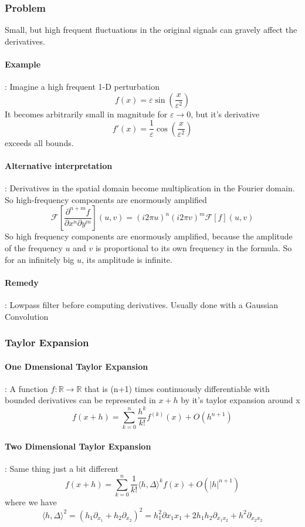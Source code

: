 \documentclass{article}
\begin{document}
\subsubsection{Problem}
Small, but high frequent fluctuations in the original signals can gravely affect the derivatives.

\paragraph{Example}: Imagine a high frequent 1-D perturbation
\[f(x) = \varepsilon\sin\left(\frac{x}{\varepsilon^2}\right)\]
It becomes arbitrarily small in magnitude for $\varepsilon \to 0$, but it's derivative
\[f'(x) = \frac{1}{\varepsilon}\cos\left(\frac{x}{\varepsilon^2}\right)\]
exceeds all bounds.

\paragraph{Alternative interpretation}: Derivatives in the spatial domain become multiplication in the Fourier domain. So high-frequency components are enormously amplified
\[\mathcal{F}\left[\frac{\partial^{n+m}f}{\partial x^n\partial y^m}\right](u,v) = (i2\pi u)^n(i2\pi v)^m\mathcal{F}[f](u,v)\]
So high frequency components are enormously amplified, because the amplitude of the frequency $u$ and $v$ is proportional to its own frequency in the formula. So for an infinitely big $u$, its amplitude is infinite. 


\paragraph{Remedy}: Lowpass filter before computing derivatives. Usually done with a Gaussian Convolution

\subsubsection{Taylor Expansion}
\paragraph{One Dmensional Taylor Expansion}: A function $f:\mathbb{R}\to\mathbb{R}$ that is (n+1) times continuously differentiable with bounded derivatives can be represented in $x+h$ by it's taylor expansion around x
\[f(x+h) = \sum_{k=0}^n\frac{h^k}{k!}f^{(k)}(x) + O(h^{n+1})\]

\paragraph{Two Dimensional Taylor Expansion}: Same thing just a bit different
\[f(x+h) = \sum_{k=0}^n\frac{1}{k!}\langle h,\Delta\rangle^k f(x) + O(|h|^{n+1})\]
where we have
\[\langle h,\Delta \rangle^2 = (h_1\partial_{x_1} + h_2\partial_{x_2})^2 = h_1^2\partial{x_1x_1} + 2h_1h_2\partial_{x_1x_2} + h^2\partial_{x_2x_2}\]
\end{document}
